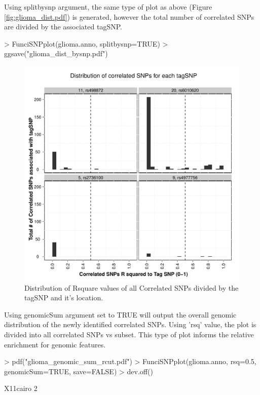 \documentclass[a4paper]{article}
\begin{document}
Using splitbysnp argument, the same type of plot as above (Figure 
        \ref{fig:glioma_dist.pdf}) is generated, however the total number of 
correlated SNPs are divided by the associated tagSNP.
\begin{Schunk}
\begin{Sinput}
> FunciSNPplot(glioma.anno, splitbysnp=TRUE)
> ggsave("glioma_dist_bysnp.pdf")
\end{Sinput}
\end{Schunk}
\begin{figure}[ht!]
\begin{center}
\includegraphics{glioma_dist_bysnp.pdf}
\caption{\label{fig:glioma_dist_bysnp.pdf} Distribution of Rsquare values of all
 Correlated SNPs divided by the tagSNP and it's location.}
{\footnotesize{}}
\end{center}
\end{figure}
Using genomicSum argument set to TRUE will output the overall genomic 
distribution of the newly identified correlated SNPs.  Using 'rsq' value, the 
plot is divided into all correlated SNPs vs subset. This type of plot informs the 
relative enrichment for genomic features.
\begin{Schunk}
\begin{Sinput}
> pdf("glioma_genomic_sum_rcut.pdf")
> FunciSNPplot(glioma.anno, rsq=0.5, genomicSum=TRUE, save=FALSE)
> dev.off()
\end{Sinput}
\begin{Soutput}
X11cairo 
       2 
\end{Soutput}
\end{Schunk}
\end{document}
